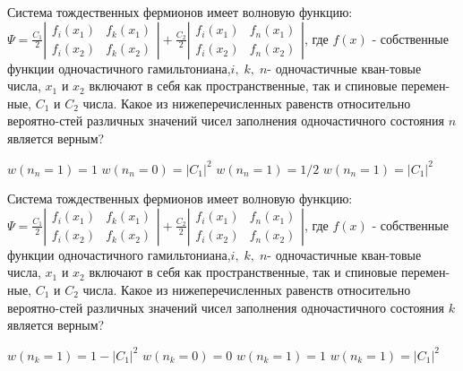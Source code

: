 \documentclass[11pt,a4paper]{exam}
\begin{document}
\begin{questions}
\question Система тождественных фермионов имеет волновую функцию:
$\Psi  = \frac{{{C_1}}}{2}\left| {\begin{array}{*{20}{c}}
{{f_i}({x_1})}&{{f_k}({x_1})}\\
{{f_i}({x_2})}&{{f_k}({x_2})}
\end{array}} \right| + \frac{{{C_2}}}{2}\left| {\begin{array}{*{20}{c}}
{{f_i}({x_1})}&{{f_n}({x_1})}\\
{{f_i}({x_2})}&{{f_n}({x_2})}
\end{array}} \right|$, 
где $f(x)$ - собственные функции одночастичного гамильтониана,$i,\;k,\;n$- одночастичные кван-товые числа, ${x_1}$ и ${x_2}$ включают в себя как пространственные, так и спиновые перемен-ные, ${C_1}$ и ${C_2}$ числа. Какое из нижеперечисленных равенств относительно вероятно-стей различных значений чисел заполнения одночастичного состояния $n$ является верным?
\begin{choices}
\choice $w({n_n} = 1) = 1$   
\choice $w({n_n} = 0) = {\left| {{C_1}} \right|^2}$  
\choice $w({n_n} = 1) = 1/2$ 
\choice $w({n_n} = 1) = {\left| {{C_1}} \right|^2}$
\end{choices}

\question Система тождественных фермионов имеет волновую функцию:
$\Psi  = \frac{{{C_1}}}{2}\left| {\begin{array}{*{20}{c}}
{{f_i}({x_1})}&{{f_k}({x_1})}\\
{{f_i}({x_2})}&{{f_k}({x_2})}
\end{array}} \right| + \frac{{{C_2}}}{2}\left| {\begin{array}{*{20}{c}}
{{f_i}({x_1})}&{{f_n}({x_1})}\\
{{f_i}({x_2})}&{{f_n}({x_2})}
\end{array}} \right|$, 
где $f(x)$ - собственные функции одночастичного гамильтониана,$i,\;k,\;n$- одночастичные кван-товые числа, ${x_1}$ и ${x_2}$ включают в себя как пространственные, так и спиновые перемен-ные, ${C_1}$ и ${C_2}$ числа. Какое из нижеперечисленных равенств относительно вероятно-стей различных значений чисел заполнения одночастичного состояния $k$ является верным?
\begin{choices}
\choice $w({n_k} = 1) = 1 - |{C_1}{|^2}$ 
\choice $w({n_k} = 0) = 0$   
\choice $w({n_k} = 1) = 1$   
\choice $w({n_k} = 1) = {\left| {{C_1}} \right|^2}$
\end{choices}


\end{questions}
\end{document}
